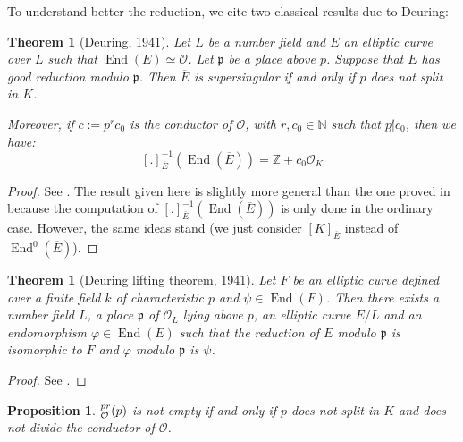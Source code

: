 \documentclass[a4paper,10pt]{report}
\theoremstyle{definition}
\theoremstyle{plain}
\newtheorem{proposition}[definition]{Proposition}
\newtheorem{theorem}[definition]{Theorem}
\theoremstyle{definition}
\newcommand{\N}{\mathbb{N}}
\newcommand{\Z}{\mathbb{Z}}
\newcommand{\mO}{\mathcal{O}}
\renewcommand{\(}{\left(}
\renewcommand{\)}{\right)}
\newcommand{\mfp}{\mathfrak{p}}
\DeclareMathOperator{\End}{End}
\let\SS\relax
\DeclareMathOperator{\SS}{SS}
\begin{document}
To understand better the reduction, we cite two classical results due to Deuring:

\begin{theorem}[Deuring, 1941]\label{theorem 1}
Let $L$ be a number field and $E$ an elliptic curve over $L$ such that $\End(E)\simeq \mO$.  Let $\mfp$ be a place above $p$. Suppose that $E$ has good reduction modulo $\mfp$.  Then $\overline{E}$ is supersingular if and only if $p$ does not split in $K$.  

Moreover,  if $c:=p^r c_0$ is the conductor of $\mO$, with $r,c_0\in\N$ such that $p\not|c_0$, then we have:
\[[.]_{\overline{E}}^{-1}(\End(\overline{E}))=\Z+c_0\mO_K\]
\end{theorem}

\begin{proof}
See \cite[chapter 13, theorem 12]{Lang_EF}.  The result given here is slightly more general than the one proved in \cite{Lang_EF} because the computation of $[.]_{\overline{E}}^{-1}(\End(\overline{E}))$ is only done in the ordinary case. However, the same ideas stand (we just consider $[K]_{\overline{E}}$ instead of $\End^0(\overline{E})$).
\end{proof}

\begin{theorem}[Deuring lifting theorem, 1941]\label{theorem 2}
Let $F$ be an elliptic curve defined over a finite field $k$ of characteristic $p$ and $\psi\in\End(F)$. Then there exists a number field $L$, a place $\mfp$ of $\mO_L$ lying above $p$, an elliptic curve $E/L$ and an endomorphism $\varphi\in\End(E)$ such that the reduction of $E$ modulo $\mfp$ is isomorphic to $F$ and $\varphi$ modulo $\mfp$ is $\psi$.
\end{theorem}

\begin{proof}
See \cite[chapter 13, theorem 14]{Lang_EF}.
\end{proof}

\begin{proposition}\label{proposition 2}
$\SS_{\mO}^{pr}(p)$ is not empty if and only if $p$ does not split in $K$ and does not divide the conductor of $\mO$. 
\end{proposition}
\end{document}
